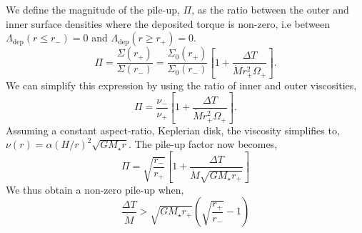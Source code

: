 We define the  magnitude of the pile-up, $\Pi$, as the ratio between the outer and inner surface densities where the deposited torque is non-zero, i.e between  $\Lambda_\text{dep}(r \le r_-) = 0$ and $\Lambda_\text{dep}(r \ge r_+) = 0$.
\begin{equation}
\Pi = \frac{\Sigma(r_+)}{\Sigma(r_-)} = \frac{\Sigma_0(r_+)}{\Sigma_0(r_-)} \left[ 1 + \frac{\Delta T}{\dot{M} r_+^2 \Omega_+} \right].
\end{equation}
We can simplify this expression by using the ratio of inner and outer viscosities, 
\begin{equation} \label{eq:pile_up}
\Pi = \frac{\nu_-}{\nu_+} \left[ 1 + \frac{\Delta T}{\dot{M} r_+^2 \Omega_+} \right].
\end{equation}
Assuming a constant aspect-ratio, Keplerian disk, the viscosity simplifies to, $\nu(r) = \alpha \left( H / r \right)^2 \sqrt{ G M_\star r}$. The pile-up factor now becomes,
\begin{equation}
\Pi = \sqrt{ \frac{ r_-}{r_+}} \left[ 1  + \frac{\Delta T}{\dot{M} \sqrt{ G M_\star r_+}} \right]
\end{equation}
We thus obtain a non-zero pile-up when, 
\begin{equation}
\frac{\Delta T}{\dot{M}} > \sqrt{G M_\star r_+} \left( \sqrt{ \frac{r_+}{r_-} } - 1 \right)  
\end{equation}
